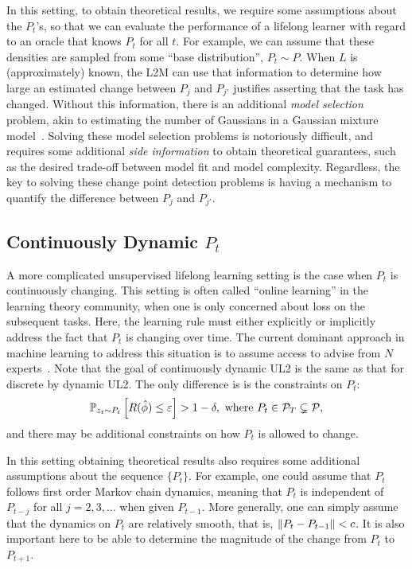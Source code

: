 \documentclass{article}
\begin{document}
In this setting, to obtain theoretical results, we require some assumptions about the $P_t$'s, so that we can evaluate the performance of a lifelong learner with regard to an oracle that knows $P_t$ for all $t$.  For example, we can assume that these densities are sampled from some ``base distribution'', $P_t \sim P$. When $L$ is (approximately) known, the L2M can use that information to determine how large an estimated change between $P_j$ and $P_{j'}$ justifies asserting that the task has changed.  Without this information, there is an additional \emph{model selection} problem, akin to estimating the number of Gaussians in a Gaussian mixture model~\cite{GMM}.  Solving these model selection problems is notoriously difficult, and requires some additional \emph{side information} to obtain theoretical guarantees, such as the desired trade-off between model fit and model complexity.  Regardless, the key to solving these change point detection problems is having a mechanism to quantify the difference between $P_j$ and $P_{j'}$. 




\subsection{Continuously Dynamic $P_t$}
\label{sec:smooth}

A  more complicated unsupervised lifelong learning setting is the case when $P_t$ is continuously changing.  This setting is often called ``online learning'' in the learning theory community, when one is only concerned about loss on the subsequent tasks. Here, the learning rule must either explicitly or implicitly address the fact that $P_t$ is  changing over time.  The current dominant approach in machine learning to address this situation is to assume access to advise from $N$ experts~\cite{Mohri2012}. Note that the goal of continuously dynamic UL2 is the same as that for discrete by dynamic UL2.  The only difference is is the constraints on $P_t$:
\begin{align} \label{eq:online}        
    \mathbb{P}_{ z_t \sim P_t} \left[R(\hat{\phi})  \leq \varepsilon \right] > 1 - \delta, \text{ where } P_t \in \mathcal{P}_T \subsetneq \mathcal{P}, 
\end{align}
and there may be additional constraints on how $P_t$ is allowed to change.

In this setting obtaining theoretical results also requires some additional assumptions about the sequence $\{P_t\}$.
For example, one could assume that $P_t$ follows  first order Markov chain dynamics, meaning that $P_t$ is independent of $P_{t-j}$  for all $j=2,3,...$ when given $P_{t-1}$.  More generally, one can simply assume that the dynamics on $P_t$ are relatively smooth, that is, $\left \lVert P_t - P_{t-1} \right \rVert < c$. It is also important here to be able to determine the magnitude of the change from $P_t$ to $P_{t+1}$. 
\end{document}
